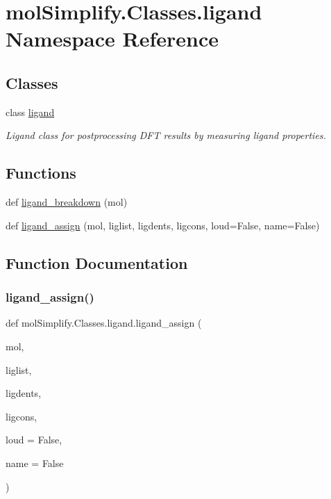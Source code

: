 \hypertarget{namespacemolSimplify_1_1Classes_1_1ligand}{}\section{mol\+Simplify.\+Classes.\+ligand Namespace Reference}
\label{namespacemolSimplify_1_1Classes_1_1ligand}
\subsection*{Classes}
\begin{DoxyCompactItemize}
\item 
class \hyperlink{classmolSimplify_1_1Classes_1_1ligand_1_1ligand}{ligand}
\begin{DoxyCompactList}\small\item\em Ligand class for postprocessing D\+FT results by measuring ligand properties. \end{DoxyCompactList}\end{DoxyCompactItemize}
\subsection*{Functions}
\begin{DoxyCompactItemize}
\item 
def \hyperlink{namespacemolSimplify_1_1Classes_1_1ligand_a12137cc10c21aa301cdbb3b8fea4587b}{ligand\+\_\+breakdown} (mol)
\item 
def \hyperlink{namespacemolSimplify_1_1Classes_1_1ligand_af3e381b3fddbf3c317a63da1c36abca5}{ligand\+\_\+assign} (mol, liglist, ligdents, ligcons, loud=False, name=False)
\end{DoxyCompactItemize}


\subsection{Function Documentation}
\mbox{\label{namespacemolSimplify_1_1Classes_1_1ligand_af3e381b3fddbf3c317a63da1c36abca5}} 
\subsubsection{\texorpdfstring{ligand\+\_\+assign()}{ligand\_assign()}}
{\footnotesize\ttfamily def mol\+Simplify.\+Classes.\+ligand.\+ligand\+\_\+assign (\begin{DoxyParamCaption}\item[{}]{mol,  }\item[{}]{liglist,  }\item[{}]{ligdents,  }\item[{}]{ligcons,  }\item[{}]{loud = {\ttfamily False},  }\item[{}]{name = {\ttfamily False} }\end{DoxyParamCaption})}

